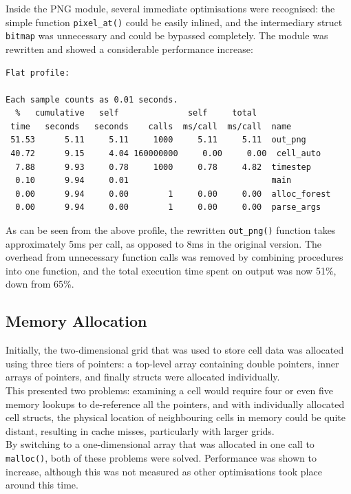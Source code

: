 \documentclass[11pt,a4paper]{report}
\begin{document}
Inside the PNG module, several immediate optimisations were recognised: the
simple function \texttt{pixel\_at()} could be easily inlined, and the
intermediary struct \texttt{bitmap} was unnecessary and could be bypassed
completely. The module was rewritten and showed a considerable
performance increase:


\begin{verbatim}
Flat profile:

Each sample counts as 0.01 seconds.
  %   cumulative   self              self     total
 time   seconds   seconds    calls  ms/call  ms/call  name
 51.53      5.11     5.11     1000     5.11     5.11  out_png
 40.72      9.15     4.04 160000000     0.00     0.00  cell_auto
  7.88      9.93     0.78     1000     0.78     4.82  timestep
  0.10      9.94     0.01                             main
  0.00      9.94     0.00        1     0.00     0.00  alloc_forest
  0.00      9.94     0.00        1     0.00     0.00  parse_args

\end{verbatim}

As can be seen from the above profile, the rewritten \texttt{out\_png()}
function takes approximately 5ms per call, as opposed to 8ms in the original
version. The overhead from unnecessary function calls was removed by combining
procedures into one function, and the total execution time spent on output was
now 51\%, down from 65\%.

\subsection{Memory Allocation}

Initially, the two-dimensional grid that was used to store cell data was
allocated using three tiers of pointers: a top-level array containing double
pointers, inner arrays of pointers, and finally structs were allocated
individually.\\

This presented two problems: examining a cell would require four or even five
memory lookups to de-reference all the pointers, and with individually allocated
cell structs, the physical location of neighbouring cells in memory could be
quite distant, resulting in cache misses, particularly with larger grids.\\

By switching to a one-dimensional array that was allocated in one call to
\texttt{malloc()}, both of these problems were solved. Performance was shown to 
increase, although this was not measured as other optimisations took place
around this time.\\
\end{document}
